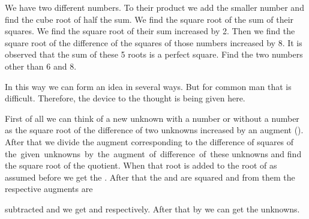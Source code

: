 \documentclass[]{article}
\begin{document}
{We have two different numbers. To their product we add the smaller
number and find the cube root of half the sum. We find the square root
of the sum of their squares. We find the square root of their sum
increased by 2. Then we find the square root of the difference of the
squares of those numbers increased by 8. It is observed that the sum of these 5 roots is a perfect square. Find the two numbers other than 6 and 8.}

\begin{quote}  {}  \end{quote}

In this way we can form an idea in several ways. But for common man
that is difficult. Therefore, the device to the thought is being given here.

\begin{quote}  {
}  \end{quote}

First of all we can think of a new unknown with a number or without a number as the square root of the difference of two unknowns increased by an augment ({}). After that we divide the augment corresponding to the difference of squares of the \,given \,unknowns \,by \,the \,augment \,of \,difference \,of \,these unknowns and find the square root of the quotient. When that root is added to the root of {} as assumed before we get the {}. After that the {} and {} are squared
and from them the respective augments are

\newpage
\large

\noindent subtracted and we get {} and {} respectively. After that by {}
we can get the unknowns.

\begin{quote}  {
}  \end{quote}
\end{document}
